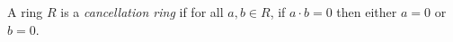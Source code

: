 \documentclass{article}
\begin{document}
A ring $R$ is a {\em cancellation ring} if for all $a,b \in R$, if $a \cdot b = 0$ then either $a=0$ or $b=0$.
\end{document}
